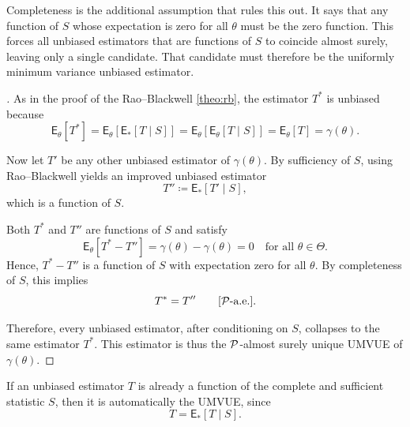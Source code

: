 Completeness is the additional assumption that rules this out.  
It says that any function of \(S\) whose expectation is zero for all \(\theta\) must be the zero function.  
This forces all unbiased estimators that are functions of \(S\) to coincide almost surely, leaving only a single candidate.  
That candidate must therefore be the uniformly minimum variance unbiased estimator.

\begin{proof}[]
As in the proof of the Rao--Blackwell \autoref{theo:rb}, the estimator \(T^{*}\) is unbiased because
\[
\mathsf{E}_{\theta}[T^{*}]
= \mathsf{E}_{\theta}\!\left[\mathsf{E}_{*}[T\mid S]\right]
= \mathsf{E}_{\theta}\!\left[\mathsf{E}_{\theta}[T\mid S]\right]
= \mathsf{E}_{\theta}[T]
= \gamma(\theta).
\]

Now let \(T'\) be any other unbiased estimator of \(\gamma(\theta)\).  
By sufficiency of \(S\), using Rao--Blackwell yields an improved unbiased estimator
\[
T'' \coloneqq \mathsf{E}_{*}[T' \mid S],
\]
which is a function of \(S\).

Both \(T^{*}\) and \(T''\) are functions of \(S\) and satisfy
\[
\mathsf{E}_{\theta}[T^{*}-T''] = \gamma(\theta)-\gamma(\theta)=0
\quad \text{for all } \theta\in\Theta.
\]
Hence, \(T^{*}-T''\) is a function of \(S\) with expectation zero for all \(\theta\).
By completeness of \(S\), this implies
\[
T^{*} = T'' \qquad [\mathcal{P}\text{-a.e.}].
\]

Therefore, every unbiased estimator, after conditioning on \(S\), collapses to the same estimator \(T^{*}\).  
This estimator is thus the \(\mathcal{P}\)-almost surely unique UMVUE of \(\gamma(\theta)\).
\end{proof}

\begin{note}
If an unbiased estimator \(T\) is already a function of the complete and sufficient statistic \(S\), then it is automatically the UMVUE, since
\[
T = \mathsf{E}_{*}[T\mid S].
\]
\end{note}

